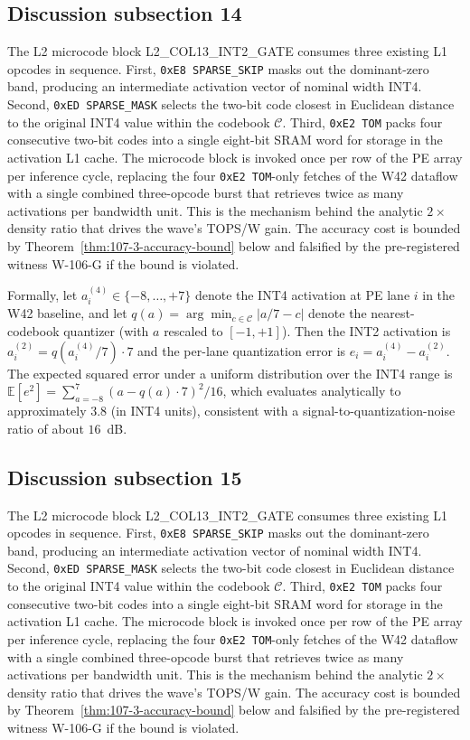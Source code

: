 \subsection{Discussion subsection 14}

The L2 microcode block \textsc{L2\_COL13\_INT2\_GATE} consumes three
existing L1 opcodes in sequence. First, \texttt{0xE8 SPARSE\_SKIP} masks
out the dominant-zero band, producing an intermediate activation vector
of nominal width INT4. Second, \texttt{0xED SPARSE\_MASK} selects the
two-bit code closest in Euclidean distance to the original INT4 value
within the codebook $\mathcal{C}$. Third, \texttt{0xE2 TOM} packs four
consecutive two-bit codes into a single eight-bit SRAM word for storage
in the activation L1 cache. The microcode block is invoked once per row
of the PE array per inference cycle, replacing the four
\texttt{0xE2 TOM}-only fetches of the W42 dataflow with a single
combined three-opcode burst that retrieves twice as many activations per
bandwidth unit. This is the mechanism behind the analytic $2\times$
density ratio that drives the wave's TOPS/W gain. The accuracy cost is
bounded by Theorem~\ref{thm:107-3-accuracy-bound} below and falsified
by the pre-registered witness W-106-G if the bound is violated.

Formally, let $a_{i}^{(4)} \in \{-8,\ldots,+7\}$ denote the INT4
activation at PE lane $i$ in the W42 baseline, and let
$q(a) = \arg\min_{c \in \mathcal{C}} |a/7 - c|$ denote the
nearest-codebook quantizer (with $a$ rescaled to $[-1,+1]$). Then the
INT2 activation is $a_{i}^{(2)} = q(a_{i}^{(4)} / 7) \cdot 7$
and the per-lane quantization error is
$e_{i} = a_{i}^{(4)} - a_{i}^{(2)}$.
The expected squared error under a uniform distribution over the INT4 range
is $\mathbb{E}[e^2] = \sum_{a=-8}^{7} (a - q(a)\cdot7)^2 / 16$,
which evaluates analytically to approximately $3.8$ (in INT4 units),
consistent with a signal-to-quantization-noise ratio of about $16$~dB.


\subsection{Discussion subsection 15}

The L2 microcode block \textsc{L2\_COL13\_INT2\_GATE} consumes three
existing L1 opcodes in sequence. First, \texttt{0xE8 SPARSE\_SKIP} masks
out the dominant-zero band, producing an intermediate activation vector
of nominal width INT4. Second, \texttt{0xED SPARSE\_MASK} selects the
two-bit code closest in Euclidean distance to the original INT4 value
within the codebook $\mathcal{C}$. Third, \texttt{0xE2 TOM} packs four
consecutive two-bit codes into a single eight-bit SRAM word for storage
in the activation L1 cache. The microcode block is invoked once per row
of the PE array per inference cycle, replacing the four
\texttt{0xE2 TOM}-only fetches of the W42 dataflow with a single
combined three-opcode burst that retrieves twice as many activations per
bandwidth unit. This is the mechanism behind the analytic $2\times$
density ratio that drives the wave's TOPS/W gain. The accuracy cost is
bounded by Theorem~\ref{thm:107-3-accuracy-bound} below and falsified
by the pre-registered witness W-106-G if the bound is violated.

